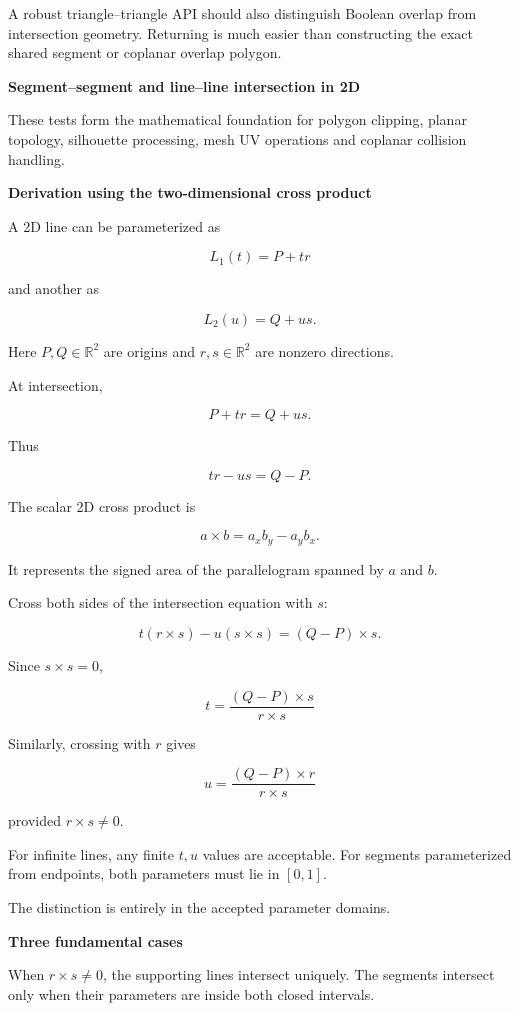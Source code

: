 A robust triangle--triangle API should also distinguish Boolean overlap from intersection geometry. Returning  is much easier than constructing the exact shared segment or coplanar overlap polygon.

\textbf{Segment--segment and line--line intersection in 2D}

These tests form the mathematical foundation for polygon clipping, planar topology, silhouette processing, mesh UV operations and coplanar collision handling.

\textbf{Derivation using the two-dimensional cross product}

A 2D line can be parameterized as

\[
L_1(t)=P+tr
\]

and another as

\[
L_2(u)=Q+us.
\]

Here \(P,Q\in\mathbb R^2\) are origins and \(r,s\in\mathbb R^2\) are nonzero directions.

At intersection,

\[
P+tr=Q+us.
\]

Thus

\[
tr-us=Q-P.
\]

The scalar 2D cross product is

\[
a\times b=a_xb_y-a_yb_x.
\]

It represents the signed area of the parallelogram spanned by \(a\) and \(b\).

Cross both sides of the intersection equation with \(s\):

\[
t(r\times s)-u(s\times s)=(Q-P)\times s.
\]

Since \(s\times s=0\),

\[
\boxed{ t=\frac{(Q-P)\times s}{r\times s} }
\]

Similarly, crossing with \(r\) gives

\[
\boxed{ u=\frac{(Q-P)\times r}{r\times s} }
\]

provided \(r\times s\ne0\).

For infinite lines, any finite \(t,u\) values are acceptable. For segments parameterized from endpoints, both parameters must lie in \([0,1]\).

The distinction is entirely in the accepted parameter domains.

\textbf{Three fundamental cases}

When \(r\times s\ne0\), the supporting lines intersect uniquely. The segments intersect only when their parameters are inside both closed intervals.

